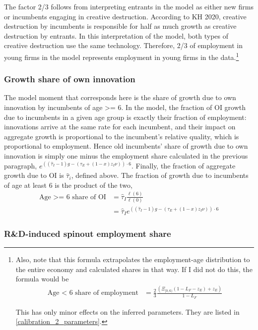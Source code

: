 \documentclass[11pt,english]{article}
\theoremstyle{remark}
\begin{document}
The factor 2/3 follows from interpreting entrants in the model as either new firms or incumbents engaging in creative destruction. According to KH 2020, creative destruction by incumbents is responsible for half as much growth as creative destruction by entrants. In this interpretation of the model, both types of creative destruction use the same technology. Therefore, 2/3 of employment in young firms in the model represents employment in young firms in the data.\footnote{Also, note that this formula extrapolates the employment-age distribution to the entire economy and calculated shares in that way. If I did not do this, the formula would be
	\begin{align*}
	\textrm{Age < 6 share of employment} &= \frac{2}{3} \frac{(\Xi_{[0,6)} (1 - L_F -z_E) + z_E)}{1-L_F}
	\end{align*}
	
	This has only minor effects on the inferred parameters. They are listed in \autoref{calibration_2_parameters}.}

\subsubsection{Growth share of own innovation}

The model moment that corresponds here is the share of growth due to own innovation by incumbents of age >= 6. In the model, the fraction of OI growth due to incumbents in a given age group is exactly their fraction of employment: innovations arrive at the same rate for each incumbent, and their impact on aggregate growth is proportional to the incumbent's relative quality, which is proportional to employment. Hence old incumbents' share of growth due to own innovation is simply one minus the employment share calculated in the previous paragraph, $e^{((\hat{\tau}_I -1)g - (\tau_E + (1-x)z_I \nu))\cdot 6}$. Finally, the fraction of aggregate growth due to OI is $\hat{\tau}_i$, defined above. The fraction of growth due to incumbents of age at least 6 is the product of the two, 
\begin{align*}
\textrm{Age >= 6 share of OI} &= \hat{\tau}_I \frac{\ell(6)}{\ell(0)} \\
 &= \hat{\tau}_I e^{((\hat{\tau}_I -1)g - (\tau_E + (1-x)z_I \nu))\cdot 6} 
\end{align*}

\subsubsection{R\&D-induced spinout employment share}
\end{document}
